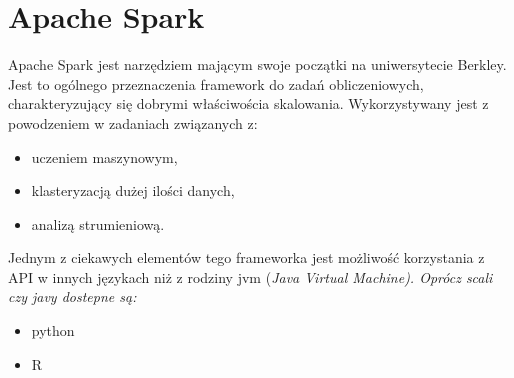 \section{Apache Spark}
Apache Spark jest narzędziem mającym swoje początki na uniwersytecie Berkley.
Jest to ogólnego przeznaczenia framework do zadań obliczeniowych,
charakteryzujący się dobrymi właściwościa skalowania.
Wykorzystywany jest z powodzeniem w zadaniach związanych z:
\begin{itemize}
  \item uczeniem maszynowym,
  \item klasteryzacją dużej ilości danych,
  \item analizą strumieniową.
\end{itemize}


Jednym z ciekawych elementów tego frameworka
jest możliwość korzystania z API w innych językach niż z rodziny jvm (\it{Java Virtual Machine}).
Oprócz scali czy javy dostepne są:
\begin{itemize}
  \item python
  \item R
\end{itemize}


